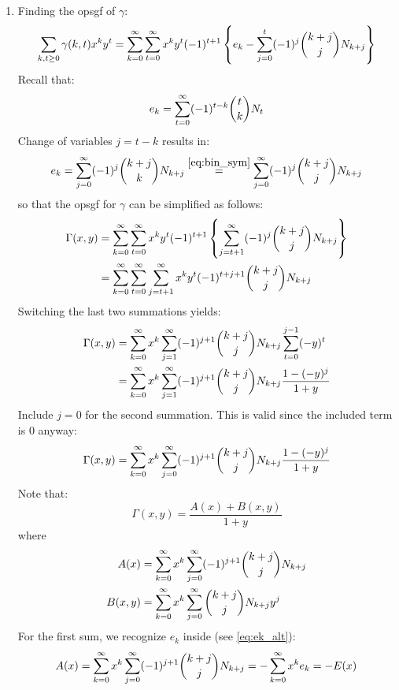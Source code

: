 \begin{solution}
    \begin{enumerate}[label=(\alph*)]
        \item Finding the opsgf of $\gamma$:
        \begin{align*}
            \sum_{k,t\geq 0} \gamma(k,t)x^k y^t = \bsum[k] \bsum[t] x^ky^t (-1)^{t+1}\left\{e_k - \sum_{j=0}^t(-1)^j \binom{k+j}{j} N_{k+j}\right\}
        \end{align*}
        Recall that:
        \[
            e_k = \bsum[t] (-1)^{t-k} \binom{t}{k}N_t
        \]
        Change of variables $j=t-k$ results in:
        \begin{equation} \label{eq:ek_alt}
            e_k = \bsum[j] (-1)^{j} \binom{k+j}{k}N_{k+j} \estep{\eqref{eq:bin_sym}}  \bsum[j] (-1)^{j} \binom{k+j}{j}N_{k+j}
        \end{equation}
        so that the opsgf for $\gamma$ can be simplified as follows:
        \begin{align*}
            \Gamma(x,y) &= \bsum[k]\bsum[t] x^k y^t (-1)^{t+1} \left\{\sum_{j = t+1}^\infty (-1)^j \binom{k+j}{j} N_{k+j}\right\} \\
            &=\bsum[k]\bsum[t] \sum_{j = t+1}^\infty x^ky^t(-1)^{t+j+1} \binom{k+j}{j} N_{k+j}
        \end{align*}
        Switching the last two summations yields:
        \begin{align*}
            \Gamma(x,y) &= \bsum[k] x^k \sum_{j=1}^\infty (-1)^{j+1}\binom{k+j}{j}N_{k+j} \sum_{t=0}^{j-1} (-y)^t \\
            &= \bsum[k] x^k \sum_{j=1}^\infty (-1)^{j+1}\binom{k+j}{j}N_{k+j} \frac{1-(-y)^j}{1+y}
        \end{align*}
        Include $j=0$ for the second summation. This is valid since the included term is $0$ anyway:
        \[
            \Gamma(x,y) = \bsum[k] x^k \bsum[j] (-1)^{j+1}\binom{k+j}{j}N_{k+j} \frac{1-(-y)^j}{1+y}
        \]
        Note that:
        \[
            \Gamma(x, y) = \frac{A(x) + B(x,y)}{1+y}
        \]
        where
        \begin{align*}
            A(x) &= \bsum[k] x^k \bsum[j](-1)^{j+1}\binom{k+j}{j}N_{k+j}  \\
            B(x, y) &= \bsum[k] x^k \bsum[j]\binom{k+j}{j}N_{k+j}y^j
        \end{align*}
        For the first sum, we recognize $e_k$ inside (see \eqref{eq:ek_alt}):
        \[
            A(x) = \bsum[k] x^k \bsum[j] (-1)^{j+1}\binom{k+j}{j}N_{k+j} = -\bsum[k]x^k e_k = -E(x)
\]
\end{enumerate}
\end{solution}
